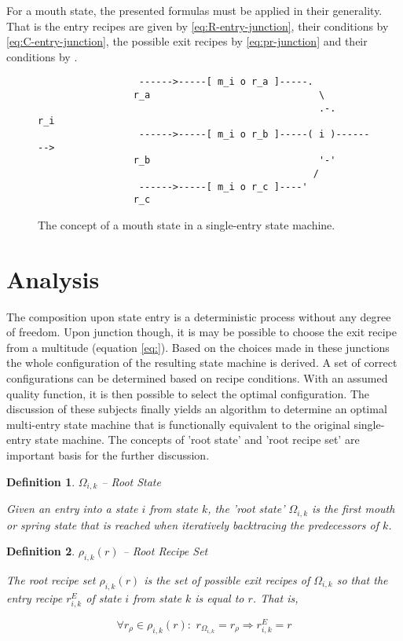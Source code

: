 \documentclass[12pt,a4paper]{scrartcl}
\newtheorem{definition}{Definition}
\begin{document}
For a mouth state, the presented formulas must be applied in their generality.
That is the entry recipes are given by \ref{eq:R-entry-junction},  their 
conditions by \ref{eq:C-entry-junction}, the possible exit recipes by 
\ref{eq:pr-junction} and their conditions by \label{eq:c-junction}.

\begin{figure}[htbp] \leavevmode \label{fig:mouth-state}
\begin{verbatim}
                  ------>-----[ m_i o r_a ]-----.
                 r_a                              \
                                                  .-.    r_i
                  ------>-----[ m_i o r_b ]-----( i )--------> 
                 r_b                              '-'
                                                 /
                  ------>-----[ m_i o r_c ]----'
                 r_c 

\end{verbatim}
\caption{The concept of a mouth state in a single-entry state machine.}
\end{figure}

\section{Analysis}

The composition upon state entry is a deterministic process without any degree
of freedom. Upon junction though, it is may be possible to choose the exit
recipe from a multitude (equation \ref{eq:}). Based on the choices made in
these junctions the whole configuration of the resulting state machine is
derived. A set of correct configurations can be determined based on recipe
conditions.  With an assumed quality function, it is then possible to select
the optimal configuration. The discussion of these subjects finally yields an
algorithm to determine an optimal  multi-entry state machine that is
functionally equivalent to the original single-entry state machine.  The
concepts of 'root state' and 'root recipe set' are important basis for the
further discussion.

\begin{definition} $\Omega_{i,k}$ -- Root State

    Given an entry into a state $i$ from state $k$, the 'root state'
    $\Omega_{i,k}$ is the first mouth or spring state that is reached when
    iteratively backtracing the predecessors of $k$.
    
\end{definition}

\begin{definition} $\rho_{i,k}(r)$ -- Root Recipe Set

    The root recipe set $\rho_{i,k}(r)$ is the set of possible exit recipes of
    $\Omega_{i,k}$ so that the entry recipe $r^E_{i,k}$ of state $i$ from state
    $k$ is equal to $r$. That is,

    \begin{equation}
        \forall r_\rho \in \rho_{i,k}(r):\,\,r_{\Omega_{i,k}} = r_\rho \Rightarrow r^E_{i,k} = r
    \end{equation}
    
\end{definition}
\end{document}
